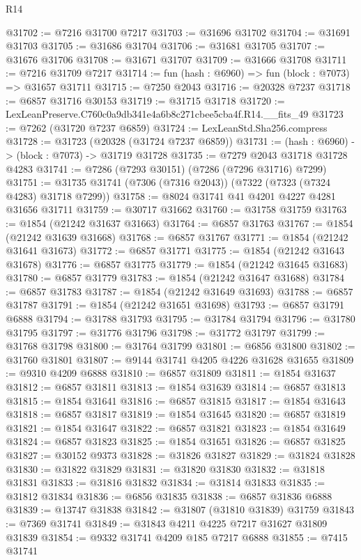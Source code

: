 \begin{lexlean}{R14}
\begin{coremodule}
@31702 := @7216 @31700 @7217
@31703 := @31696 @31702
@31704 := @31691 @31703
@31705 := @31686 @31704
@31706 := @31681 @31705
@31707 := @31676 @31706
@31708 := @31671 @31707
@31709 := @31666 @31708
@31711 := @7216 @31709 @7217
@31714 := fun (hash : @6960) => fun (block : @7073) => @31657 @31711
@31715 := @7250 @2043
@31716 := @20328 @7237
@31718 := @6857 @31716 @30153
@31719 := @31715 @31718
@31720 := LexLeanPreserve.C760c0a9db341e4a6b8c271cbee5cba4f.R14.__fits_49
@31723 := @7262 (@31720 @7237 @6859)
@31724 := LexLeanStd.Sha256.compress
@31728 := @31723 (@20328 (@31724 @7237 @6859))
@31731 := (hash : @6960) -> (block : @7073) -> @31719 @31728
@31735 := @7279 @2043 @31718 @31728 @4283
@31741 := @7286 (@7293 @30151) (@7286 (@7296 @31716) @7299)
@31751 := @31735 @31741 (@7306 (@7316 @2043)) (@7322 (@7323 (@7324 @4283) @31718 @7299))
@31758 := @8024 @31741 @41 @4201 @4227 @4281 @31656 @31711
@31759 := @30717 @31662
@31760 := @31758 @31759
@31763 := @1854 (@21242 @31637 @31663)
@31764 := @6857 @31763
@31767 := @1854 (@21242 @31639 @31668)
@31768 := @6857 @31767
@31771 := @1854 (@21242 @31641 @31673)
@31772 := @6857 @31771
@31775 := @1854 (@21242 @31643 @31678)
@31776 := @6857 @31775
@31779 := @1854 (@21242 @31645 @31683)
@31780 := @6857 @31779
@31783 := @1854 (@21242 @31647 @31688)
@31784 := @6857 @31783
@31787 := @1854 (@21242 @31649 @31693)
@31788 := @6857 @31787
@31791 := @1854 (@21242 @31651 @31698)
@31793 := @6857 @31791 @6888
@31794 := @31788 @31793
@31795 := @31784 @31794
@31796 := @31780 @31795
@31797 := @31776 @31796
@31798 := @31772 @31797
@31799 := @31768 @31798
@31800 := @31764 @31799
@31801 := @6856 @31800
@31802 := @31760 @31801
@31807 := @9144 @31741 @4205 @4226 @31628 @31655
@31809 := @9310 @4209 @6888
@31810 := @6857 @31809
@31811 := @1854 @31637
@31812 := @6857 @31811
@31813 := @1854 @31639
@31814 := @6857 @31813
@31815 := @1854 @31641
@31816 := @6857 @31815
@31817 := @1854 @31643
@31818 := @6857 @31817
@31819 := @1854 @31645
@31820 := @6857 @31819
@31821 := @1854 @31647
@31822 := @6857 @31821
@31823 := @1854 @31649
@31824 := @6857 @31823
@31825 := @1854 @31651
@31826 := @6857 @31825
@31827 := @30152 @9373
@31828 := @31826 @31827
@31829 := @31824 @31828
@31830 := @31822 @31829
@31831 := @31820 @31830
@31832 := @31818 @31831
@31833 := @31816 @31832
@31834 := @31814 @31833
@31835 := @31812 @31834
@31836 := @6856 @31835
@31838 := @6857 @31836 @6888
@31839 := @13747 @31838
@31842 := @31807 (@31810 @31839) @31759
@31843 := @7369 @31741
@31849 := @31843 @4211 @4225 @7217 @31627 @31809 @31839
@31854 := @9332 @31741 @4209 @185 @7217 @6888
@31855 := @7415 @31741

\end{coremodule}
\end{lexlean}
